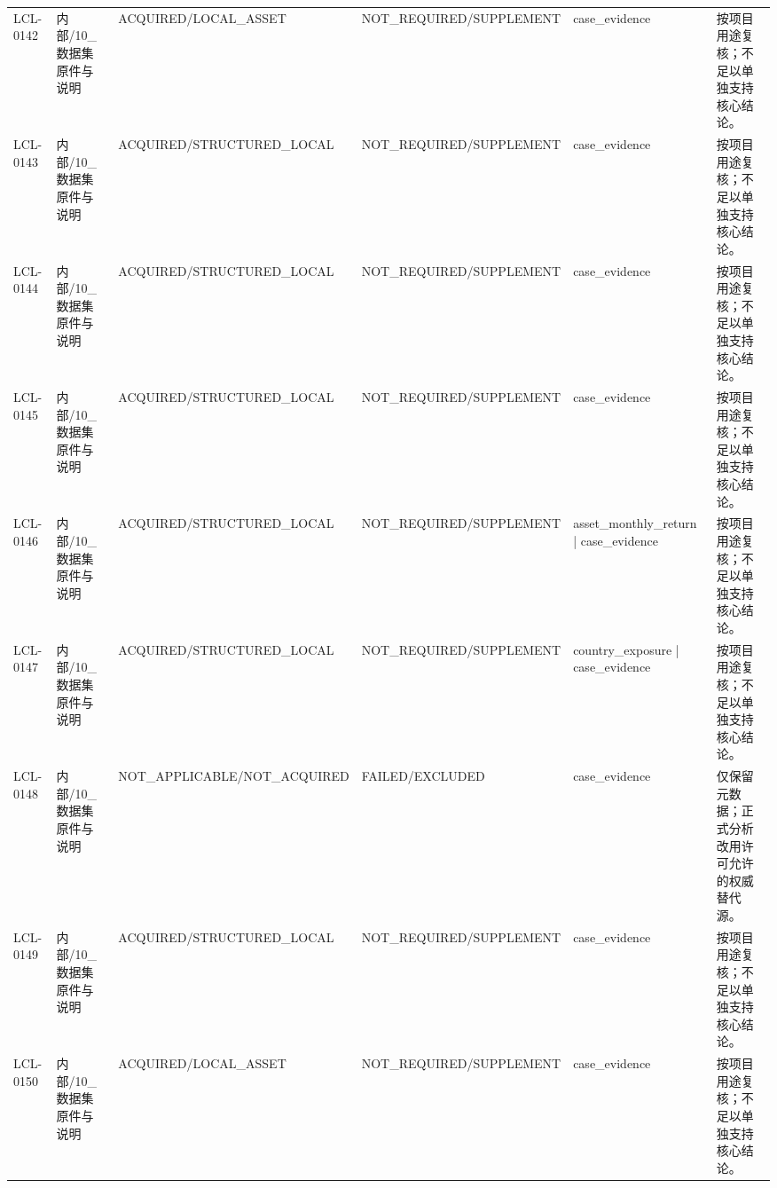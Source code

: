 \begin{landscape}
\begin{longtable}{p{1.8cm}p{2.6cm}p{2.6cm}p{2.6cm}p{4.8cm}p{7.2cm}}
LCL-0142 & 内部/\allowbreak{}10\_\allowbreak{}数据集原件与说明 & ACQUIRED/\allowbreak{}LOCAL\_\allowbreak{}ASSET & NOT\_\allowbreak{}REQUIRED/\allowbreak{}SUPPLEMENT & case\_\allowbreak{}evidence & 按项目用途复核；不足以单独支持核心结论。\\
LCL-0143 & 内部/\allowbreak{}10\_\allowbreak{}数据集原件与说明 & ACQUIRED/\allowbreak{}STRUCTURED\_\allowbreak{}LOCAL & NOT\_\allowbreak{}REQUIRED/\allowbreak{}SUPPLEMENT & case\_\allowbreak{}evidence & 按项目用途复核；不足以单独支持核心结论。\\
LCL-0144 & 内部/\allowbreak{}10\_\allowbreak{}数据集原件与说明 & ACQUIRED/\allowbreak{}STRUCTURED\_\allowbreak{}LOCAL & NOT\_\allowbreak{}REQUIRED/\allowbreak{}SUPPLEMENT & case\_\allowbreak{}evidence & 按项目用途复核；不足以单独支持核心结论。\\
LCL-0145 & 内部/\allowbreak{}10\_\allowbreak{}数据集原件与说明 & ACQUIRED/\allowbreak{}STRUCTURED\_\allowbreak{}LOCAL & NOT\_\allowbreak{}REQUIRED/\allowbreak{}SUPPLEMENT & case\_\allowbreak{}evidence & 按项目用途复核；不足以单独支持核心结论。\\
LCL-0146 & 内部/\allowbreak{}10\_\allowbreak{}数据集原件与说明 & ACQUIRED/\allowbreak{}STRUCTURED\_\allowbreak{}LOCAL & NOT\_\allowbreak{}REQUIRED/\allowbreak{}SUPPLEMENT & asset\_\allowbreak{}monthly\_\allowbreak{}return | case\_\allowbreak{}evidence & 按项目用途复核；不足以单独支持核心结论。\\
LCL-0147 & 内部/\allowbreak{}10\_\allowbreak{}数据集原件与说明 & ACQUIRED/\allowbreak{}STRUCTURED\_\allowbreak{}LOCAL & NOT\_\allowbreak{}REQUIRED/\allowbreak{}SUPPLEMENT & country\_\allowbreak{}exposure | case\_\allowbreak{}evidence & 按项目用途复核；不足以单独支持核心结论。\\
LCL-0148 & 内部/\allowbreak{}10\_\allowbreak{}数据集原件与说明 & NOT\_\allowbreak{}APPLICABLE/\allowbreak{}NOT\_\allowbreak{}ACQUIRED & FAILED/\allowbreak{}EXCLUDED & case\_\allowbreak{}evidence & 仅保留元数据；正式分析改用许可允许的权威替代源。\\
LCL-0149 & 内部/\allowbreak{}10\_\allowbreak{}数据集原件与说明 & ACQUIRED/\allowbreak{}STRUCTURED\_\allowbreak{}LOCAL & NOT\_\allowbreak{}REQUIRED/\allowbreak{}SUPPLEMENT & case\_\allowbreak{}evidence & 按项目用途复核；不足以单独支持核心结论。\\
LCL-0150 & 内部/\allowbreak{}10\_\allowbreak{}数据集原件与说明 & ACQUIRED/\allowbreak{}LOCAL\_\allowbreak{}ASSET & NOT\_\allowbreak{}REQUIRED/\allowbreak{}SUPPLEMENT & case\_\allowbreak{}evidence & 按项目用途复核；不足以单独支持核心结论。\\

\end{longtable}
\end{landscape}
